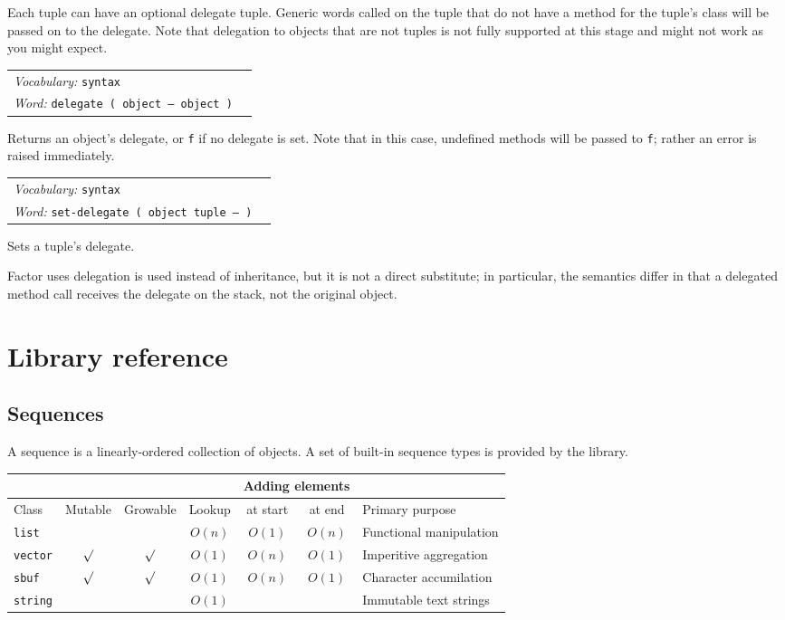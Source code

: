 \documentclass{book}
\newcommand{\vocabulary}[1]{\emph{Vocabulary:} \texttt{#1}&\\}
\newcommand{\ordinaryword}[2]{\index{\texttt{#1}}\emph{Word:} \texttt{#2}&\\}
\newcommand{\wordtable}[1]{

\begin{tabularx}{12cm}[t]{lX}
\hline
#1
\hline
\end{tabularx}

}
\begin{document}

Each tuple can have an optional delegate tuple. Generic words called on
the tuple that do not have a method for the tuple's class will be passed on
to the delegate. Note that delegation to objects that are not tuples is not fully supported at this stage and might not work as you might expect.
\wordtable{
\vocabulary{syntax}
\ordinaryword{delegate}{delegate ( object -- object )}

}
Returns an object's delegate, or \texttt{f} if no delegate is set. Note that in this case,  undefined methods will be passed to \texttt{f}; rather an error is raised immediately.
\wordtable{
\vocabulary{syntax}
\ordinaryword{set-delegate}{set-delegate ( object tuple -- )}

}
Sets a tuple's delegate.

Factor uses delegation is used instead of inheritance, but it is not a direct
substitute; in particular, the semantics differ in that a delegated
method call receives the delegate on the stack, not the original object.

\chapter{Library reference}

\section{Sequences}

A sequence is a linearly-ordered collection of objects. A set of built-in sequence types  is provided by the library.

\begin{tabular}[t]{l|c|c|c|c|c|l}
\multicolumn{4}{l|}{}&\multicolumn{2}{c|}{Adding elements}&\multicolumn{1}{l}{}\\
\hline
Class&Mutable&Growable&Lookup&at start&at end&Primary purpose\\
\hline
\texttt{list}&&&$O(n)$&$O(1)$&$O(n)$&Functional manipulation\\
\texttt{vector}&$\surd$&$\surd$&$O(1)$&$O(n)$&$O(1)$&Imperitive aggregation\\
\texttt{sbuf}&$\surd$&$\surd$&$O(1)$&$O(n)$&$O(1)$&Character accumilation\\
\texttt{string}&&&$O(1)$&&&Immutable text strings
\end{tabular}
\end{document}
